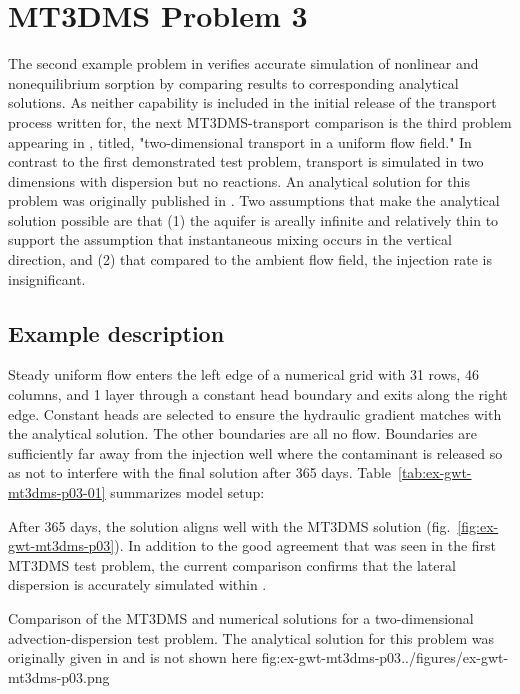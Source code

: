 \section{MT3DMS Problem 3}

The second example problem in \cite{zheng1999mt3dms} verifies accurate simulation of nonlinear and nonequilibrium sorption by comparing results to corresponding analytical solutions. As neither capability is included in the initial release of the transport process written for\mf, the next MT3DMS-\mf transport comparison is the third problem appearing in \cite{zheng1999mt3dms}, titled, "two-dimensional transport in a uniform flow field." In contrast to the first demonstrated test problem, transport is simulated in two dimensions with dispersion but no reactions. An analytical solution for this problem was originally published in \cite{wilson1978}. Two assumptions that make the analytical solution possible are that (1) the aquifer is areally infinite and relatively thin to support the assumption that instantaneous mixing occurs in the vertical direction, and (2) that compared to the ambient flow field, the injection rate is insignificant.  

\subsection{Example description}

Steady uniform flow enters the left edge of a numerical grid with 31 rows, 46 columns, and 1 layer through a constant head boundary and exits along the right edge. Constant heads are selected to ensure the hydraulic gradient matches with the analytical solution. The other boundaries are all no flow. Boundaries are sufficiently far away from the injection well where the contaminant is released so as not to interfere with the final solution after 365 days. Table~\ref{tab:ex-gwt-mt3dms-p03-01} summarizes model setup:



After 365 days, the \mf solution aligns well with the MT3DMS solution (fig.~\ref{fig:ex-gwt-mt3dms-p03}). In addition to the good agreement that was seen in the first  MT3DMS test problem, the current comparison confirms that the lateral dispersion is accurately simulated within \mf.


\begin{StandardFigure}
	{Comparison of the MT3DMS and \mf numerical solutions for a two-dimensional advection-dispersion test problem.  The analytical solution for this problem was originally given in \cite{wilson1978} and is not shown here}
	{fig:ex-gwt-mt3dms-p03}{../figures/ex-gwt-mt3dms-p03.png}
\end{StandardFigure}